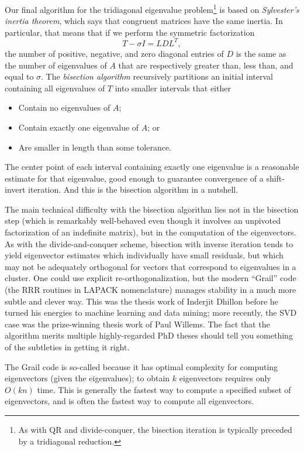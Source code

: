 \documentclass[12pt, leqno]{article} %
\begin{document}
Our final algorithm for the tridiagonal eigenvalue problem\footnote{%
As with QR and divide-conquer, the bisection iteration is typically
preceded by a tridiagonal reduction.
} is based on {\em Sylvester's inertia theorem},
which says that congruent matrices have the same inertia.
In particular, that means that if we perform the symmetric
factorization
\[
  T - \sigma I = L D L^T,
\]
the number of positive, negative, and zero diagonal entries of $D$
is the same as the number of eigenvalues of $A$ that are respectively
greater than, less than, and equal to $\sigma$.  The {\em bisection
algorithm} recursively partitions an initial interval containing all
eigenvalues of $T$ into smaller intervals that either
\begin{itemize}
\item Contain no eigenvalues of $A$;
\item Contain exactly one eigenvalue of $A$; or
\item Are smaller in length than some tolerance.
\end{itemize}
The center point of each interval containing exactly one eigenvalue is
a reasonable estimate for that eigenvalue, good enough to guarantee
convergence of a shift-invert iteration.  And this is the bisection
algorithm in a nutshell.

The main technical difficulty with the bisection algorithm lies not
in the bisection step (which is remarkably well-behaved even though
it involves an unpivoted factorization of an indefinite matrix),
but in the computation of the eigenvectors.  As with the divide-and-conquer
scheme, bisection with inverse iteration tends to yield eigenvector
estimates which individually have small residuals, but which may not be
adequately orthogonal for vectors that correspond to eigenvalues in a
cluster.  One could use explicit re-orthogonalization, but the modern
``Grail'' code (the RRR routines in LAPACK nomenclature) manages
stability in a much more subtle and clever way.
This was the thesis work of Inderjit Dhillon before he turned his
energies to machine learning and data mining; more recently, the SVD
case was the prize-winning thesis work of Paul Willems.  The fact that
the algorithm merits multiple highly-regarded PhD theses should tell
you something of the subtleties in getting it right.

The Grail code is so-called because it has optimal complexity for
computing eigenvectors (given the eigenvalues); to obtain $k$ eigenvectors
requires only $O(kn)$ time.  This is generally the fastest way to
compute a specified subset of eigenvectors, and is often the fastest
way to compute all eigenvectors.
\end{document}
